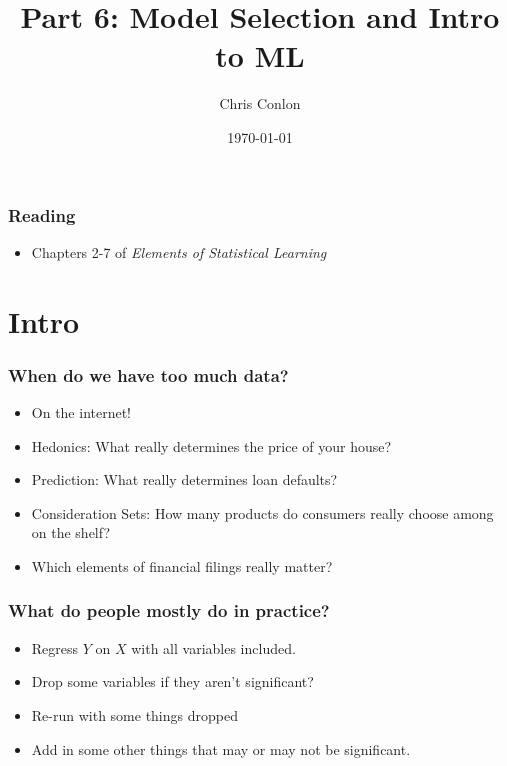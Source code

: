 \documentclass[xcolor=pdftex,dvipsnames,table,mathserif,aspectratio=169]{beamer}
\begin{document}
\title{Part 6: Model Selection and Intro to ML}
\author{Chris Conlon}
\date{\today}

\frame{\titlepage}


\begin{frame}
\frametitle{Reading}
\begin{itemize}
\item Chapters 2-7 of \textit{Elements of Statistical Learning}
\end{itemize}

\end{frame}



\section{Intro}


\begin{frame}
\frametitle{When do we have too much data?}
\begin{itemize}
\item On the internet!
\item Hedonics: What really determines the price of your house?
\item Prediction: What really determines loan defaults?
\item Consideration Sets: How many products do consumers really choose among on the shelf?
\item Which elements of financial filings really matter?
\end{itemize}
\end{frame}


\begin{frame}
\frametitle{What do people mostly do in practice?}
\begin{itemize}
\item Regress $Y$ on $X$ with all variables included.
\item Drop some variables if they aren't significant?
\item Re-run with some things dropped
\item Add in some other things that may or may not be significant.
\end{itemize}
\end{frame}
\end{document}
